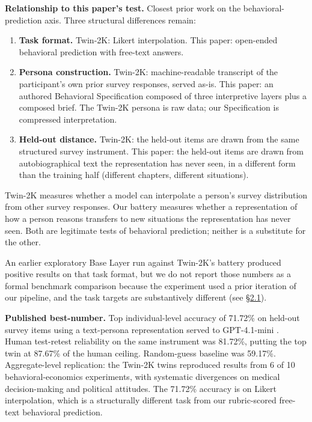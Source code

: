 \textbf{Relationship to this paper's test.} Closest prior work on the
behavioral-prediction axis. Three structural differences remain:

\begin{enumerate}
\def\labelenumi{\arabic{enumi}.}
\tightlist
\item
  \textbf{Task format.} Twin-2K: Likert interpolation. This paper:
  open-ended behavioral prediction with free-text answers.
\item
  \textbf{Persona construction.} Twin-2K: machine-readable transcript of
  the participant's own prior survey responses, served as-is. This
  paper: an authored Behavioral Specification composed of three
  interpretive layers plus a composed brief. The Twin-2K persona is raw
  data; our Specification is compressed interpretation.
\item
  \textbf{Held-out distance.} Twin-2K: the held-out items are drawn from
  the same structured survey instrument. This paper: the held-out items
  are drawn from autobiographical text the representation has never
  seen, in a different form than the training half (different chapters,
  different situations).
\end{enumerate}

Twin-2K measures whether a model can interpolate a person's survey
distribution from other survey responses. Our battery measures whether a
representation of how a person reasons transfers to new situations the
representation has never seen. Both are legitimate tests of behavioral
prediction; neither is a substitute for the other.

An earlier exploratory Base Layer run against Twin-2K's battery produced
positive results on that task format, but we do not report those numbers
as a formal benchmark comparison because the experiment used a prior
iteration of our pipeline, and the task targets are substantively
different (see \hyperref[prior-measurement-targets-and-the-gap-representational-accuracy-fills]{§2.1}).

\textbf{Published best-number.} Top individual-level accuracy of 71.72\%
on held-out survey items using a text-persona representation served to
GPT-4.1-mini \citep{toubia2025twin2k}. Human test-retest
reliability on the same instrument was 81.72\%, putting the top twin at
87.67\% of the human ceiling. Random-guess baseline was 59.17\%.
Aggregate-level replication: the Twin-2K twins reproduced results from 6
of 10 behavioral-economics experiments, with systematic divergences on
medical decision-making and political attitudes. The 71.72\% accuracy is
on Likert interpolation, which is a structurally different task from our
rubric-scored free-text behavioral prediction.

